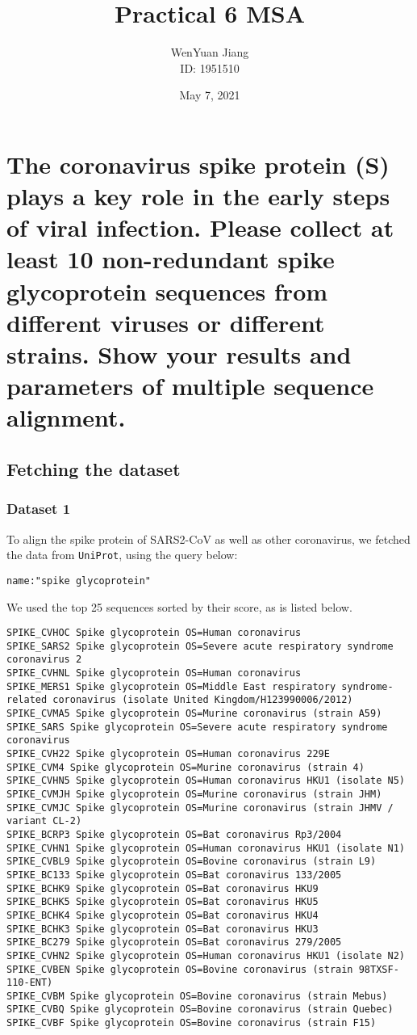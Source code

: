\documentclass[en,black,12pt,normal]{elegantnote}
\title{Practical 6 MSA}
\author{WenYuan Jiang\\ID: 1951510}
\institute{School of Life Science, Tongji University}
\date{May 7, 2021}
\begin{document}
\maketitle

\section{The coronavirus spike protein (S) plays a key role in the early steps of viral infection. Please collect at least 10 non-redundant spike glycoprotein sequences from different viruses or different strains.  Show your results and parameters of multiple sequence alignment.}

\subsection{Fetching the dataset}
\subsubsection{Dataset 1}
To align the spike protein of SARS2-CoV as well as other coronavirus, 
we fetched the data from \texttt{UniProt}, using the query below:

\lstinline{name:"spike glycoprotein"}

We used the top 25 sequences sorted by their score, as is listed below.

\begin{lstlisting}
SPIKE_CVHOC Spike glycoprotein OS=Human coronavirus
SPIKE_SARS2 Spike glycoprotein OS=Severe acute respiratory syndrome coronavirus 2
SPIKE_CVHNL Spike glycoprotein OS=Human coronavirus
SPIKE_MERS1 Spike glycoprotein OS=Middle East respiratory syndrome-related coronavirus (isolate United Kingdom/H123990006/2012)
SPIKE_CVMA5 Spike glycoprotein OS=Murine coronavirus (strain A59)
SPIKE_SARS Spike glycoprotein OS=Severe acute respiratory syndrome coronavirus
SPIKE_CVH22 Spike glycoprotein OS=Human coronavirus 229E
SPIKE_CVM4 Spike glycoprotein OS=Murine coronavirus (strain 4)
SPIKE_CVHN5 Spike glycoprotein OS=Human coronavirus HKU1 (isolate N5)
SPIKE_CVMJH Spike glycoprotein OS=Murine coronavirus (strain JHM)
SPIKE_CVMJC Spike glycoprotein OS=Murine coronavirus (strain JHMV / variant CL-2)
SPIKE_BCRP3 Spike glycoprotein OS=Bat coronavirus Rp3/2004
SPIKE_CVHN1 Spike glycoprotein OS=Human coronavirus HKU1 (isolate N1)
SPIKE_CVBL9 Spike glycoprotein OS=Bovine coronavirus (strain L9)
SPIKE_BC133 Spike glycoprotein OS=Bat coronavirus 133/2005
SPIKE_BCHK9 Spike glycoprotein OS=Bat coronavirus HKU9
SPIKE_BCHK5 Spike glycoprotein OS=Bat coronavirus HKU5
SPIKE_BCHK4 Spike glycoprotein OS=Bat coronavirus HKU4
SPIKE_BCHK3 Spike glycoprotein OS=Bat coronavirus HKU3
SPIKE_BC279 Spike glycoprotein OS=Bat coronavirus 279/2005
SPIKE_CVHN2 Spike glycoprotein OS=Human coronavirus HKU1 (isolate N2)
SPIKE_CVBEN Spike glycoprotein OS=Bovine coronavirus (strain 98TXSF-110-ENT)
SPIKE_CVBM Spike glycoprotein OS=Bovine coronavirus (strain Mebus)
SPIKE_CVBQ Spike glycoprotein OS=Bovine coronavirus (strain Quebec)
SPIKE_CVBF Spike glycoprotein OS=Bovine coronavirus (strain F15)
\end{lstlisting}
\end{document}
